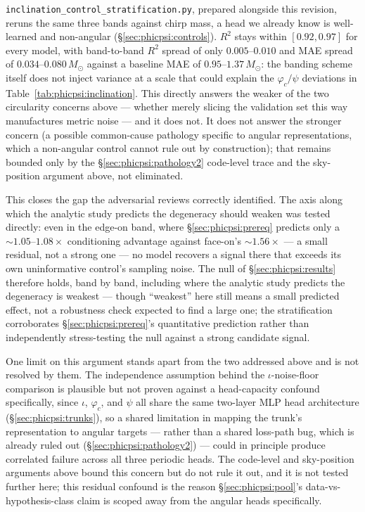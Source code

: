 \documentclass[11pt]{article}
\begin{document}
\texttt{inclination\_control\_stratification.py}, prepared alongside this revision, reruns the same three bands against chirp mass, a head we already know is well-learned and non-angular (\S\ref{sec:phicpsi:controls}).
$R^2$ stays within $[0.92, 0.97]$ for every model, with band-to-band $R^2$ spread of only $0.005$--$0.010$ and MAE spread of $0.034$--$0.080\,M_\odot$ against a baseline MAE of $0.95$--$1.37\,M_\odot$: the banding scheme itself does not inject variance at a scale that could explain the $\varphi_c/\psi$ deviations in Table~\ref{tab:phicpsi:inclination}.
This directly answers the weaker of the two circularity concerns above --- whether merely slicing the validation set this way manufactures metric noise --- and it does not.
It does not answer the stronger concern (a possible common-cause pathology specific to angular representations, which a non-angular control cannot rule out by construction); that remains bounded only by the \S\ref{sec:phicpsi:pathology2} code-level trace and the sky-position argument above, not eliminated.

This closes the gap the adversarial reviews correctly identified.
The axis along which the analytic study predicts the degeneracy should weaken was tested directly: even in the edge-on band, where \S\ref{sec:phicpsi:prereq} predicts only a $\sim 1.05$--$1.08\times$ conditioning advantage against face-on's $\sim 1.56\times$ --- a small residual, not a strong one --- no model recovers a signal there that exceeds its own uninformative control's sampling noise.
The null of \S\ref{sec:phicpsi:results} therefore holds, band by band, including where the analytic study predicts the degeneracy is weakest --- though ``weakest'' here still means a small predicted effect, not a robustness check expected to find a large one; the stratification corroborates \S\ref{sec:phicpsi:prereq}'s quantitative prediction rather than independently stress-testing the null against a strong candidate signal.

One limit on this argument stands apart from the two addressed above and is not resolved by them.
The independence assumption behind the $\iota$-noise-floor comparison is plausible but not proven against a head-capacity confound specifically, since $\iota$, $\varphi_c$, and $\psi$ all share the same two-layer MLP head architecture (\S\ref{sec:phicpsi:trunks}), so a shared limitation in mapping the trunk's representation to angular targets --- rather than a shared loss-path bug, which is already ruled out (\S\ref{sec:phicpsi:pathology2}) --- could in principle produce correlated failure across all three periodic heads.
The code-level and sky-position arguments above bound this concern but do not rule it out, and it is not tested further here; this residual confound is the reason \S\ref{sec:phicpsi:pool}'s data-vs-hypothesis-class claim is scoped away from the angular heads specifically.
\end{document}
